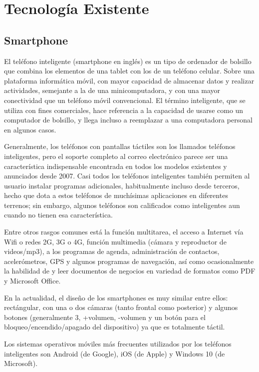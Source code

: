 \thispagestyle{plain}
	\section{Tecnología Existente}
		\subsection{Smartphone}
			\par 
				El teléfono inteligente (smartphone en inglés) es un tipo de ordenador de bolsillo que combina los elementos de una tablet con los de un teléfono celular. Sobre una plataforma informática móvil, con mayor capacidad de almacenar datos y realizar actividades, semejante a la de una minicomputadora, y con una mayor conectividad que un teléfono móvil convencional. El término inteligente, que se utiliza con fines comerciales, hace referencia a la capacidad de usarse como un computador de bolsillo, y llega incluso a reemplazar a una computadora personal en algunos casos.		
			\par \noindent
				Generalmente, los teléfonos con pantallas táctiles son los llamados teléfonos inteligentes, pero el soporte completo al correo electrónico parece ser una característica indispensable encontrada en todos los modelos existentes y anunciados desde 2007. Casi todos los teléfonos inteligentes también permiten al usuario instalar programas adicionales, habitualmente incluso desde terceros, hecho que dota a estos teléfonos de muchísimas aplicaciones en diferentes terrenos; sin embargo, algunos teléfonos son calificados como inteligentes aun cuando no tienen esa característica.			
			\par \noindent
				Entre otros rasgos comunes está la función multitarea, el acceso a Internet vía Wifi o redes 2G, 3G o 4G, función multimedia (cámara y reproductor de videos/mp3), a los programas de agenda, administración de contactos, acelerómetros, GPS y algunos programas de navegación, así como ocasionalmente la habilidad de y leer documentos de negocios en variedad de formatos como PDF y Microsoft Office.
			\par \noindent
				En la actualidad, el diseño de los smartphones es muy similar entre ellos: rectángular, con una o dos cámaras (tanto frontal como posterior) y algunos botones (generalmente 3, +volumen, -volumen y un botón para el bloqueo/encendido/apagado del dispositivo) ya que es totalmente táctil.
			\par \noindent
				Los sistemas operativos móviles más frecuentes utilizados por los teléfonos inteligentes son Android (de Google), iOS (de Apple) y Windows 10 (de Microsoft).
				

